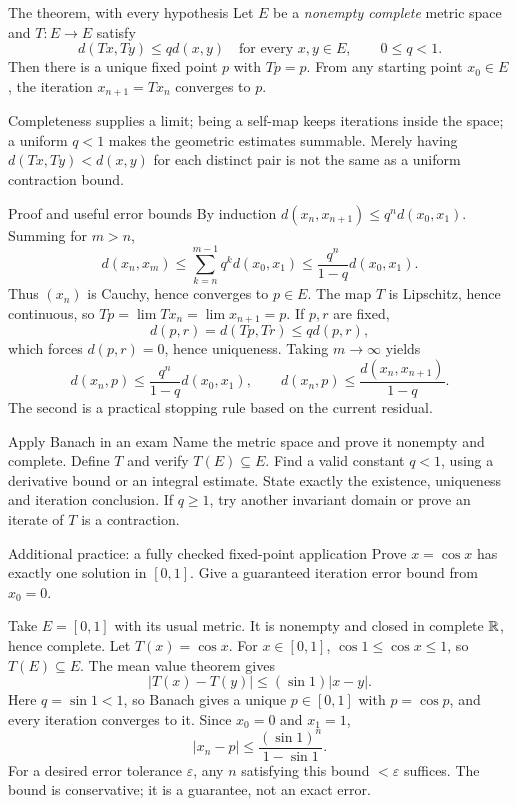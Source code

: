 \begin{note}{The theorem, with every hypothesis}
Let $E$ be a \emph{nonempty complete} metric space and $T:E\to E$ satisfy
\[d(Tx,Ty)\le qd(x,y)\quad\text{for every }x,y\in E,\qquad 0\le q<1.\]
Then there is a unique fixed point $p$ with $Tp=p$. From any starting point $x_0\in E$, the iteration $x_{n+1}=Tx_n$ converges to $p$.

Completeness supplies a limit; being a self-map keeps iterations inside the space; a uniform $q<1$ makes the geometric estimates summable. Merely having $d(Tx,Ty)<d(x,y)$ for each distinct pair is not the same as a uniform contraction bound.
\end{note}
\begin{note}{Proof and useful error bounds}
By induction $d(x_n,x_{n+1})\le q^nd(x_0,x_1)$. Summing for $m>n$,
\[d(x_n,x_m)\le\sum_{k=n}^{m-1}q^kd(x_0,x_1)\le\frac{q^n}{1-q}d(x_0,x_1).\]
Thus $(x_n)$ is Cauchy, hence converges to $p\in E$. The map $T$ is Lipschitz, hence continuous, so $Tp=\lim Tx_n=\lim x_{n+1}=p$. If $p,r$ are fixed,
\[d(p,r)=d(Tp,Tr)\le qd(p,r),\]
which forces $d(p,r)=0$, hence uniqueness. Taking $m\to\infty$ yields
\[d(x_n,p)\le\frac{q^n}{1-q}d(x_0,x_1),\qquad d(x_n,p)\le\frac{d(x_n,x_{n+1})}{1-q}.\]
The second is a practical stopping rule based on the current residual.
\end{note}
\begin{method}{Apply Banach in an exam}
Name the metric space and prove it nonempty and complete. Define $T$ and verify $T(E)\subseteq E$. Find a valid constant $q<1$, using a derivative bound or an integral estimate. State exactly the existence, uniqueness and iteration conclusion. If $q\ge1$, try another invariant domain or prove an iterate of $T$ is a contraction.
\end{method}
\begin{exam}{Additional practice: a fully checked fixed-point application}
Prove $x=\cos x$ has exactly one solution in $[0,1]$. Give a guaranteed iteration error bound from $x_0=0$.
\end{exam}
\begin{answer}
Take $E=[0,1]$ with its usual metric. It is nonempty and closed in complete $\mathbb R$, hence complete. Let $T(x)=\cos x$. For $x\in[0,1]$, $\cos1\le\cos x\le1$, so $T(E)\subseteq E$. The mean value theorem gives
\[|T(x)-T(y)|\le(\sin1)|x-y|.\]
Here $q=\sin1<1$, so Banach gives a unique $p\in[0,1]$ with $p=\cos p$, and every iteration converges to it. Since $x_0=0$ and $x_1=1$,
\[|x_n-p|\le\frac{(\sin1)^n}{1-\sin1}.\]
For a desired error tolerance $\varepsilon$, any $n$ satisfying this bound $<\varepsilon$ suffices. The bound is conservative; it is a guarantee, not an exact error.
\end{answer}
